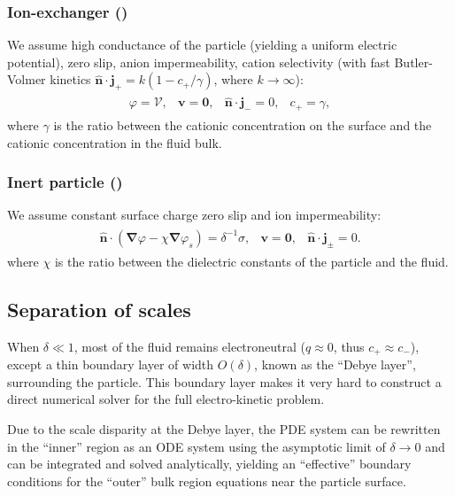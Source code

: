 \documentclass[10pt]{ijnam}
\newcommand\bnabla{\boldsymbol{\nabla}}
\newcommand\bv{\boldsymbol{v}}
\newcommand\bn{\boldsymbol{\hat{n}}}
\newcommand\bj{\boldsymbol{j}}
\newcommand\bzero{\boldsymbol{0}}
\newcommand\cV{\mathscr{V}}
\begin{document}
\subsubsection{Ion-exchanger (\cite{yariv2010migration})}
We assume high conductance of the particle (yielding a uniform electric potential),
zero slip, anion impermeability, cation selectivity 
(with fast Butler-Volmer\cite{bard2000book} kinetics
$\bn \cdot \bj_+ = k (1 - c_+/\gamma)$, where $k \rightarrow \infty$):
\begin{eqnarray}
\begin{array}{cccc}
\varphi = \cV, &
\bv = \bzero, &
\bn \cdot \bj_- = 0, &
c_+ = \gamma,
\end{array}
\end{eqnarray}
where $\gamma$ is the ratio between the cationic concentration on the surface and the cationic
concentration in the fluid bulk.

\subsubsection{Inert particle (\cite{schnitzer2012surface})}
We assume constant surface charge
zero slip and ion impermeability:
\begin{eqnarray}
\begin{array}{cccc}
\bn \cdot (\bnabla \varphi - \chi \bnabla \varphi_s) = \delta^{-1} \sigma, &
\bv = \bzero, &
\bn \cdot \bj_\pm = 0.
\end{array}
\end{eqnarray}
where $\chi$ is the ratio between the dielectric constants of the 
particle and the fluid.

\subsection{Separation of scales}
When $\delta \ll 1$, 
most of the fluid remains electroneutral ($q \approx 0$, thus $c_+ \approx c_-$), 
except a thin boundary layer of width $O(\delta)$, 
known as the ``Debye layer'', surrounding the particle.
This boundary layer makes it very hard to construct 
a direct numerical solver for the full electro-kinetic problem.

Due to the scale disparity at the Debye layer, 
the PDE system can be rewritten in the ``inner'' region 
as an ODE system using the asymptotic limit of $\delta \rightarrow 0$ 
and can be integrated and solved analytically,
yielding an ``effective'' boundary conditions for the ``outer'' bulk region equations near
the particle surface.
\end{document}
